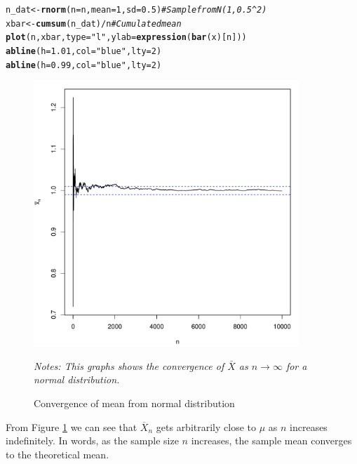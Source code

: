 \documentclass[english,12pt]{book}\usepackage[]{graphicx}\usepackage[]{xcolor}
\makeatletter
\newcommand{\hlnum}[1]{\textcolor[rgb]{0.686,0.059,0.569}{#1}}%
\newcommand{\hlsng}[1]{\textcolor[rgb]{0.192,0.494,0.8}{#1}}%
\newcommand{\hlcom}[1]{\textcolor[rgb]{0.678,0.584,0.686}{\textit{#1}}}%
\newcommand{\hlopt}[1]{\textcolor[rgb]{0,0,0}{#1}}%
\newcommand{\hldef}[1]{\textcolor[rgb]{0.345,0.345,0.345}{#1}}%
\newcommand{\hlkwb}[1]{\textcolor[rgb]{0.69,0.353,0.396}{#1}}%
\newcommand{\hlkwc}[1]{\textcolor[rgb]{0.333,0.667,0.333}{#1}}%
\newcommand{\hlkwd}[1]{\textcolor[rgb]{0.737,0.353,0.396}{\textbf{#1}}}%
\newenvironment{kframe}{%
 \def\at@end@of@kframe{}%
 \ifinner\ifhmode%
  \def\at@end@of@kframe{\end{minipage}}%
  \begin{minipage}{\columnwidth}%
 \fi\fi%
 \def\FrameCommand##1{\hskip\@totalleftmargin \hskip-\fboxsep
 \colorbox{shadecolor}{##1}\hskip-\fboxsep
     \hskip-\linewidth \hskip-\@totalleftmargin \hskip\columnwidth}%
 \MakeFramed {\advance\hsize-\width
   \@totalleftmargin\z@ \linewidth\hsize
   \@setminipage}}%
 {\par\unskip\endMakeFramed%
 \at@end@of@kframe}
\newenvironment{knitrout}{}{} %
\makeatother
\begin{document}
\begin{example}
\begin{knitrout}
\begin{kframe}
\begin{alltt}
\hldef{n_dat} \hlkwb{<-} \hlkwd{rnorm}\hldef{(}\hlkwc{n} \hldef{= n,} \hlkwc{mean} \hldef{=} \hlnum{1}\hldef{,} \hlkwc{sd} \hldef{=} \hlnum{0.5}\hldef{)} \hlcom{# Sample from N(1, 0.5^2)}
\hldef{xbar} \hlkwb{<-} \hlkwd{cumsum}\hldef{(n_dat)} \hlopt{/}  \hldef{n}                \hlcom{# Cumulated mean}
\hlkwd{plot}\hldef{(n, xbar,} \hlkwc{type} \hldef{=} \hlsng{"l"}\hldef{,} \hlkwc{ylab} \hldef{=} \hlkwd{expression}\hldef{(}\hlkwd{bar}\hldef{(x)[n]))}
\hlkwd{abline}\hldef{(}\hlkwc{h} \hldef{=} \hlnum{1.01}\hldef{,} \hlkwc{col} \hldef{=} \hlsng{"blue"}\hldef{,} \hlkwc{lty} \hldef{=} \hlnum{2}\hldef{)}
\hlkwd{abline}\hldef{(}\hlkwc{h} \hldef{=} \hlnum{0.99}\hldef{,} \hlkwc{col} \hldef{=} \hlsng{"blue"}\hldef{,} \hlkwc{lty} \hldef{=} \hlnum{2}\hldef{)}
\end{alltt}
\end{kframe}
\end{knitrout}


\begin{figure}[H]
  \caption{Convergence of mean from normal distribution}
    \label{fig:CLTnormal}
        \centering
    \begin{minipage}{.9\linewidth}
\begin{knitrout}
\color{fgcolor}

{\centering \includegraphics[width=10cm,height=10cm]{figure/CLT-normalplot-1} 

}


\end{knitrout}
\footnotesize
		\emph{Notes: This graphs shows the convergence of $\bar{X}$ as $n\to\infty$ for a normal distribution.}
	\end{minipage}
\end{figure}

From Figure \ref{fig:CLTnormal} we can see that $\overline{X}_n$ gets arbitrarily close to $\mu$ as $n$ increases indefinitely. In words, as the sample size $n$ increases, the sample mean converges to the theoretical mean. 
\end{example}
\end{document}
